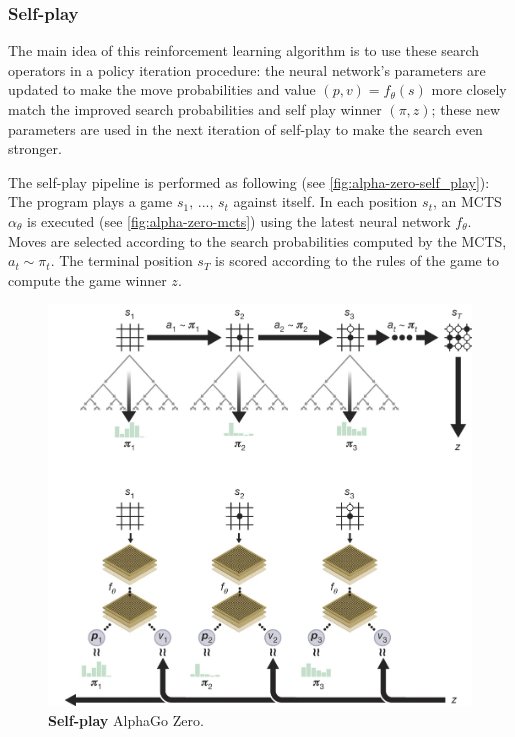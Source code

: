 \documentclass{article}
\begin{document}
\subsubsection{Self-play}

The main idea of this reinforcement learning algorithm is to use these search operators in a policy iteration procedure: the neural network’s parameters are updated to make the move probabilities and value $(p, v) = f_\theta(s)$ more closely match the improved search probabilities and self play winner $(\pi, z)$; these new parameters are used in the next iteration of self-play to make the search even stronger.

The self-play pipeline is performed as following (see \autoref{fig:alpha-zero-self_play}): The program plays a game $s_1, \, ..., \, s_t$ against itself. In each position $s_t$, an MCTS $\alpha_\theta$ is executed (see \autoref{fig:alpha-zero-mcts}) using the latest neural network $f_\theta$. Moves are selected according to the search probabilities computed by the MCTS, $a_t \sim \pi_t$. The terminal position $s_T$ is scored according to the rules of the game to compute the game winner $z$.

\begin{figure}[H]
		\centering
		\includegraphics[width=12cm,trim={66px 430px 0px 0px},clip]{alpha_go_zero_training.png}
		
		\caption{
			\textbf{Self-play} AlphaGo Zero.\cite{Silver_2016}}
		\label{fig:alpha-zero-self_play}
\end{figure}
\end{document}
